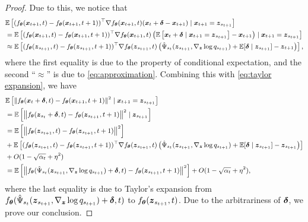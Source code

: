 \begin{proof}
	Due to this, we notice that  
	\begin{equation}
		\small
		\begin{aligned}
			& \mathbb{E}\left[(f_{\boldsymbol{\theta}}(\boldsymbol{x}_{t + 1}, t) - f_{\boldsymbol{\theta}}(\boldsymbol{x}_{t + 1}, t + 1))^{\top}\nabla f_{\boldsymbol{\theta}}(\boldsymbol{x}_{t + 1}, t)(\boldsymbol{x}_{t} + \boldsymbol{\delta} - \boldsymbol{x}_{t + 1})\mid \boldsymbol{x}_{t + 1} = \boldsymbol{z}_{s_{t + 1}}\right] \\
			& = \mathbb{E}\left[(f_{\boldsymbol{\theta}}(\boldsymbol{x}_{t + 1}, t) - f_{\boldsymbol{\theta}}(\boldsymbol{x}_{t + 1}, t + 1))^{\top}\nabla f_{\boldsymbol{\theta}}(\boldsymbol{x}_{t + 1}, t)\left(\mathbb{E}\left[\boldsymbol{x}_{t} + \boldsymbol{\delta} \mid\boldsymbol{x}_{t + 1} = \boldsymbol{z}_{s_{t + 1}}\right] - \boldsymbol{x}_{t + 1}\right)\mid \boldsymbol{x}_{t + 1} = \boldsymbol{z}_{s_{t + 1}}\right] \\
			& \approx \mathbb{E}\left[(f_{\boldsymbol{\theta}}(\boldsymbol{z}_{s_{t + 1}}, t) - f_{\boldsymbol{\theta}}(\boldsymbol{z}_{s_{t + 1}}, t + 1))^{\top}\nabla f_{\boldsymbol{\theta}}(\boldsymbol{z}_{s_{t + 1}}, t)\left(\hat{\Psi}_{s_{t}}(\boldsymbol{z}_{s_{t + 1}}, \nabla_{\boldsymbol{z}}\log{q_{s_{t + 1}}}) + \mathbb{E}[\boldsymbol{\delta}\mid \boldsymbol{z}_{s_{t + 1}}] - \boldsymbol{z}_{t + 1}\right)\right],
		\end{aligned}
	\end{equation}
    where the first equality is due to the property of conditional expectation, and the second ``$\approx$'' is due to \eqref{eq:approximation}.
	Combining this with \eqref{eq:taylor expansion}, we have 
	\begin{equation}
		\small
		\begin{aligned}
			& \mathbb{E}\left[\left\|f_{\boldsymbol{\theta}}(\boldsymbol{x}_{t} + \boldsymbol{\delta}, t) - f_{\boldsymbol{\theta}}(\boldsymbol{x}_{t + 1}, t + 1)\right\|^{2}\mid \boldsymbol{x}_{t + 1}
             = \boldsymbol{z}_{s_{t + 1}}\right] \\
             & = \mathbb{E}\left[\left\|f_{\boldsymbol{\theta}}(\boldsymbol{z}_{s_{t}} + \boldsymbol{\delta}, t) - f_{\boldsymbol{\theta}}(\boldsymbol{z}_{s_{t + 1}}, t + 1)\right\|^{2}\mid 
             \boldsymbol{z}_{s_{t + 1}}\right] \\
             & = \mathbb{E}\left[\left\|f_{\boldsymbol{\theta}}(\boldsymbol{z}_{s_{t + 1}}, t) - f_{\boldsymbol{\theta}}(\boldsymbol{z}_{s_{t + 1}}, t + 1)\right\|^{2}\right] \\
			& + \mathbb{E}\left[(f_{\boldsymbol{\theta}}(\boldsymbol{z}_{s_{t + 1}}, t) - f_{\boldsymbol{\theta}}(\boldsymbol{z}_{s_{t + 1}}, t + 1))^{\top}\nabla f_{\boldsymbol{\theta}}(\boldsymbol{z}_{s_{t + 1}}, t)\left(\hat{\Psi}_{s_{t}}(\boldsymbol{z}_{s_{t + 1}}, \nabla_{\boldsymbol{z}}\log{q_{s_{t + 1}}}) + \mathbb{E}[\boldsymbol{\delta}\mid \boldsymbol{z}_{s_{t + 1}}] - \boldsymbol{z}_{s_{t + 1}}\right)\right] \\
            & +  O(1 - \sqrt{\alpha_{t}} + \eta^{2}) \\
			& = \mathbb{E}\left[\left\|f_{\boldsymbol{\theta}}(\hat{\Psi}_{s_{t}}(\boldsymbol{z}_{s_{t + 1}}, \nabla_{\boldsymbol{z}}\log{q_{s_{t + 1}}}) + \boldsymbol{\delta}, t) - f_{\boldsymbol{\theta}}(\boldsymbol{z}_{s_{t + 1}}, t + 1)\right\|^{2}\right] +  O(1 - \sqrt{\alpha_{t}} + \eta^{2}),
		\end{aligned}
	\end{equation}
	where the last equality is due to Taylor's expansion from $f_{\boldsymbol{\theta}}(\hat{\Psi}_{s_{t}}(\boldsymbol{z}_{s_{t + 1}}, \nabla_{\boldsymbol{z}}\log{q_{s_{t + 1}}}) + \boldsymbol{\delta}, t)$ to $f_{\boldsymbol{\theta}}(\boldsymbol{z}_{s_{t + 1}}, t)$. Due to the arbitrariness of $\boldsymbol{\delta}$, we prove our conclusion.   
\end{proof}

